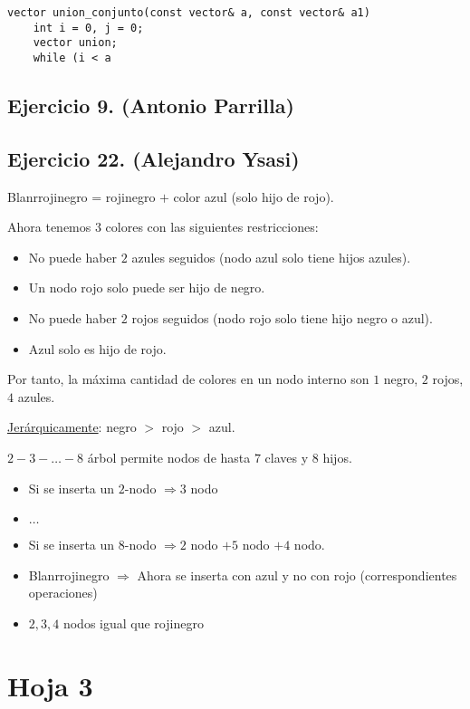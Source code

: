 \documentclass[10pt,a4paper,openright]{book}
\theoremstyle{break}
\begin{document}
\begin{lstlisting}
vector union_conjunto(const vector& a, const vector& a1)
    int i = 0, j = 0;
    vector union;
    while (i < a
\end{lstlisting}

\section{Ejercicio 9. (Antonio Parrilla)}%
\label{sec:ejercicio_9_antonio_parrilla_}


\section{Ejercicio 22. (Alejandro Ysasi)}%
\label{sec:ejercicio_22_alejandro_ysasi_}
Blanrrojinegro = rojinegro $+$ color azul (solo hijo de rojo).

Ahora tenemos $3$ colores con las siguientes restricciones: 
\begin{itemize}
    \item No puede haber $2$ azules seguidos (nodo azul solo tiene hijos azules).
    \item Un nodo rojo solo puede ser hijo de negro.
    \item No puede haber $2$ rojos seguidos (nodo rojo solo tiene hijo negro o azul).
    \item Azul solo es hijo de rojo.
\end{itemize}

Por tanto, la máxima cantidad de colores en un nodo interno son $1$ negro, $2$ rojos, $4$ azules.

\underline{Jerárquicamente}: negro $>$ rojo $>$ azul.

$2-3-\ldots-8$ árbol permite nodos de hasta $7$ claves y $8$ hijos. 
\begin{itemize}
    \item Si se inserta un $2$-nodo $\Rightarrow 3$ nodo 
    \item $\ldots$
    \item Si se inserta un $8$-nodo $\Rightarrow 2$ nodo $+ 5$ nodo $+ 4$ nodo.
    \item Blanrrojinegro $\Rightarrow$ Ahora se inserta con azul y no con rojo (correspondientes operaciones) 
    \item $2, 3, 4$ nodos igual que rojinegro
\end{itemize}

\chapter{Hoja 3}%
\label{cha:hoja_3}
\end{document}
